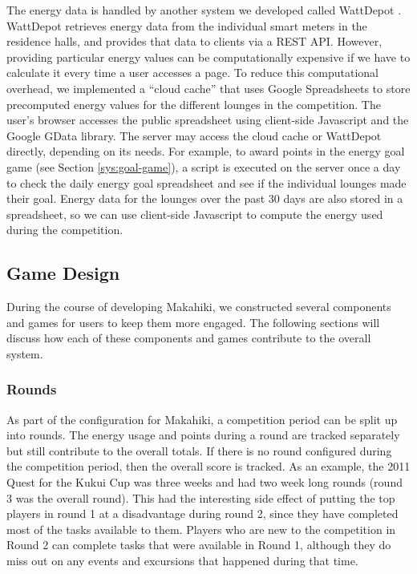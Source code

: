 \documentclass{acm_proc_article-sp}
\begin{document}
The energy data is handled by another system we developed called WattDepot 
\cite{csdl2-10-05}. WattDepot retrieves energy data from the individual smart meters in the residence halls, and provides that data to clients via a REST API. However, providing particular energy values can be computationally expensive if we have to calculate it every time a user accesses a page. To reduce this computational overhead, we implemented a ``cloud cache'' that uses Google Spreadsheets to store precomputed energy values for the different lounges in the competition. The user's browser accesses the public spreadsheet using client-side Javascript and the Google GData library. The server may access the cloud cache or WattDepot directly, depending on its needs. For example, to award points in the energy goal game (see Section \ref{sys:goal-game}), a script is executed on the server once a day to check the daily energy goal spreadsheet and see if the individual lounges made their goal. Energy data for the lounges over the past 30 days are also stored in a spreadsheet, so we can use client-side Javascript to compute the energy used during the competition.

\subsection{Game Design}
\label{sys:GameDesign}

During the course of developing Makahiki, we constructed several components and games for users to keep them more engaged. The following sections will discuss how each of these components and games contribute to the overall system.

\subsubsection{Rounds}

As part of the configuration for Makahiki, a competition period can be split up into rounds. The energy usage and points during a round are tracked separately but still contribute to the overall totals. If there is no round configured during the competition period, then the overall score is tracked. As an example, the 2011 Quest for the Kukui Cup was three weeks and had two week long rounds (round 3 was the overall round). This had the interesting side effect of putting the top players in round 1 at a disadvantage during round 2, since they have completed most of the tasks available to them. Players who are new to the competition in Round 2 can complete tasks that were available in Round 1, although they do miss out on any events and excursions that happened during that time.
\end{document}
